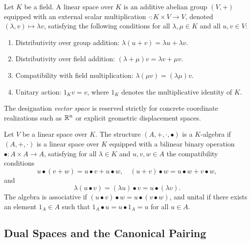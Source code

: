 \documentclass[11pt,a4paper]{article}
\begin{document}
Let $K$ be a field.
A linear space over $K$ is an additive abelian group $(V, +)$ equipped with an
external scalar multiplication $\cdot : K \times V \to V$, denoted $(\lambda, v)
\mapsto \lambda v$, satisfying the following conditions for all $\lambda, \mu
\in K$ and all $u, v \in V$:
\begin{enumerate}
  \item Distributivity over group addition: $\lambda (u + v) = \lambda u +
    \lambda v$.
  \item Distributivity over field addition: $(\lambda + \mu) v = \lambda v + \mu
    v$.
  \item Compatibility with field multiplication: $\lambda (\mu v) = (\lambda
    \mu) v$.
  \item Unitary action: $1_K v = v$, where $1_K$ denotes the multiplicative
    identity of $K$.
\end{enumerate}
The designation \emph{vector space} is reserved strictly for concrete coordinate
realizations such as $\mathbb{R}^n$ or explicit geometric displacement spaces.

Let $V$ be a linear space over $K$.
The structure $(A, +, \cdot, \bullet)$ is a $K$-algebra if $(A, +, \cdot)$ is a
linear space over $K$ equipped with a bilinear binary operation $\bullet : A
\times A \to A$, satisfying for all $\lambda \in K$ and $u, v, w \in A$ the
compatibility conditions
\begin{equation}
  u \bullet (v + w) = u \bullet v + u \bullet w, \quad
  (u + v) \bullet w = u \bullet w + v \bullet w,
\end{equation}
and
\begin{equation}
  \lambda (u \bullet v) = (\lambda u) \bullet v = u \bullet (\lambda v).
\end{equation}
The algebra is associative if $(u \bullet v) \bullet w = u \bullet (v \bullet
w)$, and unital if there exists an element $1_A \in A$ such that $1_A \bullet u
= u \bullet 1_A = u$ for all $u \in A$.

\subsection{Dual Spaces and the Canonical Pairing}
\label{subsec:dual_spaces}
\end{document}
